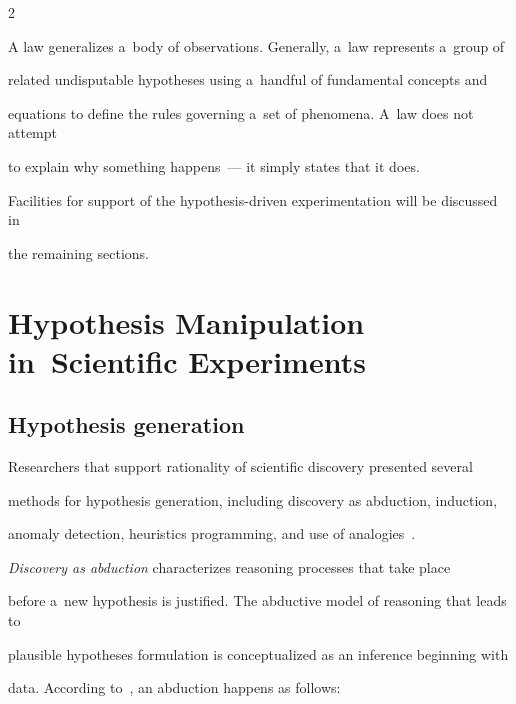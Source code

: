 \begin{multicols}{2}





  A law generalizes a~body of observations. Generally, a~law represents a~group of


related undisputable hypotheses using a~handful of fundamental concepts and


equations to define the rules governing a~set of phenomena. A~law does not attempt


to explain why something happens~--- it simply states that it does.





  Facilities for support of the hypothesis-driven experimentation will be discussed in


the remaining sections.





\section{Hypothesis Manipulation in~Scientific Experiments}





\subsection{Hypothesis generation}





  \noindent


  Researchers that support rationality of scientific discovery presented several


methods for hypothesis generation, including discovery as abduction, induction,


anomaly detection, heuristics programming, and use of analogies~\cite{14-kl}.





  \textit{Discovery as abduction} characterizes reasoning processes that take place


before a~new hypothesis is justified. The abductive model of reasoning that leads to


plausible hypotheses formulation is conceptualized as an inference beginning with


data. According to~\cite{15-kl}, an abduction happens as follows:



\end{multicols}

